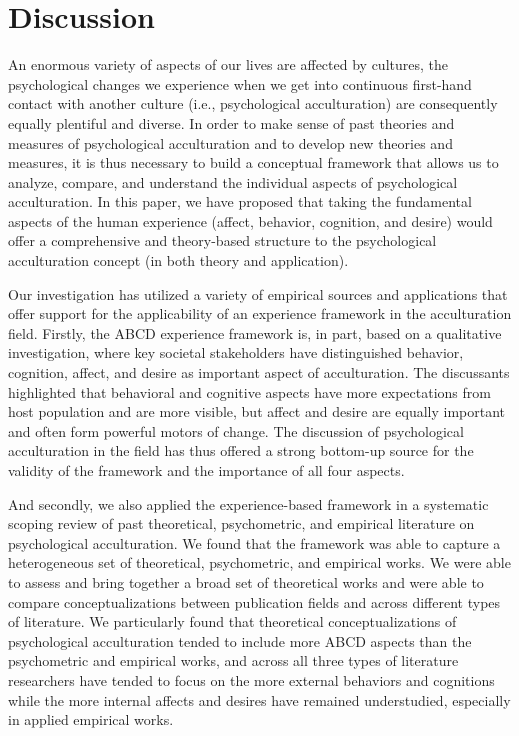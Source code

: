 \documentclass[man, 12pt, a4paper, mask]{apa7}
\begin{document}
\section{Discussion}
An enormous variety of aspects of our lives are affected by cultures, the psychological changes we experience when we get into continuous first-hand contact with another culture (i.e., psychological acculturation) are consequently equally plentiful and diverse.
In order to make sense of past theories and measures of psychological acculturation and to develop new theories and measures, it is thus necessary to build a conceptual framework that allows us to analyze, compare, and understand the individual aspects of psychological acculturation.
In this paper, we have proposed that taking the fundamental aspects of the human experience (affect, behavior, cognition, and desire) would offer a comprehensive and theory-based structure to the psychological acculturation concept (in both theory and application). 

Our investigation has utilized a variety of empirical sources and applications that offer support for the applicability of an experience framework in the acculturation field. Firstly, the ABCD experience framework is, in part, based on a qualitative investigation, where key societal stakeholders have distinguished behavior, cognition, affect, and desire as important aspect of acculturation. The discussants highlighted that behavioral and cognitive aspects have more expectations from host population and are more visible, but affect and desire are equally important and often form powerful motors of change. The discussion of psychological acculturation in the field has thus offered a strong bottom-up source for the validity of the framework and the importance of all four aspects.

And secondly, we also applied the experience-based framework in a systematic scoping review of past theoretical, psychometric, and empirical literature on psychological acculturation.
We found that the framework was able to capture a heterogeneous set of theoretical, psychometric, and empirical works. We were able to assess and bring together a broad set of theoretical works and were able to compare conceptualizations between publication fields and across different types of literature. We particularly found that theoretical conceptualizations of psychological acculturation tended to include more ABCD aspects than the psychometric and empirical works, and across all three types of literature researchers have tended to focus on the more external behaviors and cognitions while the more internal affects and desires have remained understudied, especially in applied empirical works.
    
\end{document}
